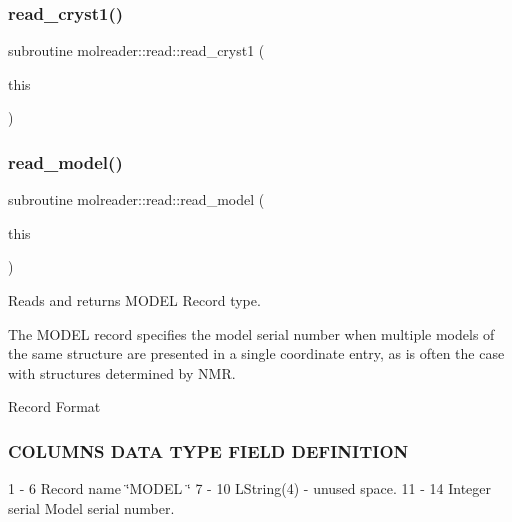 \subsubsection{\texorpdfstring{read\+\_\+cryst1()}{read\_cryst1()}}
{\footnotesize\ttfamily subroutine molreader\+::read\+::read\+\_\+cryst1 (\begin{DoxyParamCaption}\item[{type(\hyperlink{structmolreader_1_1cryst1}{cryst1}), intent(inout)}]{this }\end{DoxyParamCaption})\hspace{0.3cm}{\ttfamily [private]}}

\mbox{\label{interfacemolreader_1_1read_a2548b1adf92b85ff6a09af908f1acd2a}} 
\subsubsection{\texorpdfstring{read\+\_\+model()}{read\_model()}}
{\footnotesize\ttfamily subroutine molreader\+::read\+::read\+\_\+model (\begin{DoxyParamCaption}\item[{type(\hyperlink{structmolreader_1_1model}{model}), intent(inout)}]{this }\end{DoxyParamCaption})\hspace{0.3cm}{\ttfamily [private]}}



Reads and returns M\+O\+D\+EL Record type. 

The M\+O\+D\+EL record specifies the model serial number when multiple models of the same structure are presented in a single coordinate entry, as is often the case with structures determined by N\+MR.

Record Format

\subsubsection*{C\+O\+L\+U\+M\+NS D\+A\+TA T\+Y\+PE F\+I\+E\+LD D\+E\+F\+I\+N\+I\+T\+I\+ON }

1 -\/ 6 Record name \char`\"{}\+M\+O\+D\+E\+L \char`\"{} 7 -\/ 10 L\+String(4) -\/ unused space. 11 -\/ 14 Integer serial Model serial number. \mbox{\label{interfacemolreader_1_1read_aaf6cd04056b69eb6239580d134167c32}} 
